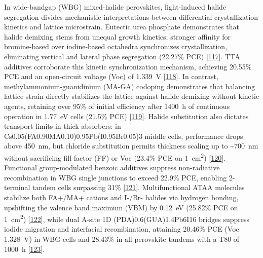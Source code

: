\documentclass[
  11pt,
]{article}
\begin{document}
In wide-bandgap (WBG) mixed-halide perovskites, light-induced halide
segregation divides mechanistic interpretations between differential
crystallization kinetics and lattice microstrain. Eutectic urea
phosphate demonstrates that halide demixing stems from unequal growth
kinetics; stronger affinity for bromine-based over iodine-based
octahedra synchronizes crystallization, eliminating vertical and lateral
phase segregation (22.27\% PCE)
{[}\href{https://doi.org/10.1002/anie.2535666}{117}{]}. TTA additives
corroborate this kinetic synchronization mechanism, achieving 20.55\%
PCE and an open-circuit voltage (Voc) of \qty{1.339}{\volt}
{[}\href{https://doi.org/10.1002/smll.202513111}{118}{]}. In contrast,
methylammonium-guanidinium (MA-GA) codoping demonstrates that balancing
lattice strain directly stabilizes the lattice against halide demixing
without kinetic agents, retaining over 95\% of initial efficiency after
\qty{1400}{\hour} of continuous operation in \qty{1.77}{\electronvolt}
cells (21.5\% PCE)
{[}\href{https://doi.org/10.1021/acsenergylett.6c00328}{119}{]}. Halide
substitution also dictates transport limits in thick absorbers: in
Cs0.05(FA0.90MA0.10)0.95Pb(I0.95Br0.05)3 middle cells, performance drops
above \qty{450}{\nano\meter}, but chloride substitution permits
thickness scaling up to \textasciitilde{}\qty{700}{\nano\meter} without
sacrificing fill factor (FF) or Voc (23.4\% PCE on
\qty{1}{\centi\meter\squared})
{[}\href{https://doi.org/10.1002/solr.70410}{120}{]}. Functional
group-modulated benzoic additives suppress non-radiative recombination
in WBG single junctions to exceed 22.9\% PCE, enabling 2-terminal tandem
cells surpassing 31\%
{[}\href{https://doi.org/10.1002/adfm.75640}{121}{]}. Multifunctional
ATAA molecules stabilize both FA+/MA+ cations and I-/Br- halides via
hydrogen bonding, upshifting the valence band maximum (VBM) by
\qty{0.12}{\electronvolt} (25.82\% PCE on \qty{1}{\centi\meter\squared})
{[}\href{https://doi.org/10.1002/adfm.202524302}{122}{]}, while dual
A-site 1D (PDA)0.6(GUA)1.4Pb6I16 bridges suppress iodide migration and
interfacial recombination, attaining 20.46\% PCE (Voc
\qty{1.328}{\volt}) in WBG cells and 28.43\% in all-perovskite tandems
with a T80 of \qty{1000}{\hour}
{[}\href{https://doi.org/10.1021/acsenergylett.5c04243}{123}{]}.
\end{document}
